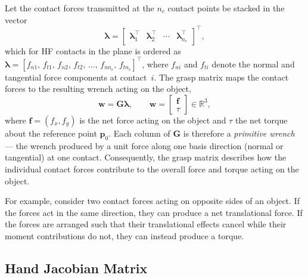 Let the contact forces transmitted at the $n_c$ contact points be stacked in
the vector
\begin{equation}
    \boldsymbol{\lambda}
    =
    \begin{bmatrix}
        \boldsymbol{\lambda}_1^\top & \boldsymbol{\lambda}_2^\top & \cdots & \boldsymbol{\lambda}_{n_c}^\top
    \end{bmatrix}^\top ,
    \label{eq:lambda-stacked}
\end{equation}
which for HF contacts in the plane is ordered as
$\boldsymbol{\lambda} = [f_{n1},\, f_{t1},\, f_{n2},\, f_{t2},\, \ldots,\, f_{n n_c},\, f_{t n_c}]^\top$,
where $f_{ni}$ and $f_{ti}$ denote the normal and tangential force
components at contact~$i$.
The grasp matrix maps the contact forces to the resulting wrench acting on
the object,
\begin{equation}
    \boldsymbol{w} = \boldsymbol{G}\boldsymbol{\lambda},
    \qquad
    \boldsymbol{w} =
    \begin{bmatrix}
        \boldsymbol{f} \\ \tau
    \end{bmatrix}
    \in \mathbb{R}^{3},
    \label{eq:wrench-map}
\end{equation}
where $\boldsymbol{f}=(f_x,f_y)$ is the net force acting on the object and
$\tau$ the net torque about the reference point $\boldsymbol{p}_0$.
Each column of $\boldsymbol{G}$ is therefore a \emph{primitive wrench} ---
the wrench produced by a unit force along one basis direction (normal or
tangential) at one contact.
Consequently, the grasp matrix describes how the individual contact forces
contribute to the overall force and torque acting on the object.

For example, consider two contact forces acting on opposite sides of an
object. If the forces act in the same direction, they can produce a net
translational force. If the forces are arranged such that their
translational effects cancel while their moment contributions do not, they
can instead produce a torque.

\subsection{Hand Jacobian Matrix}
\label{sec:hand-jacobian}

